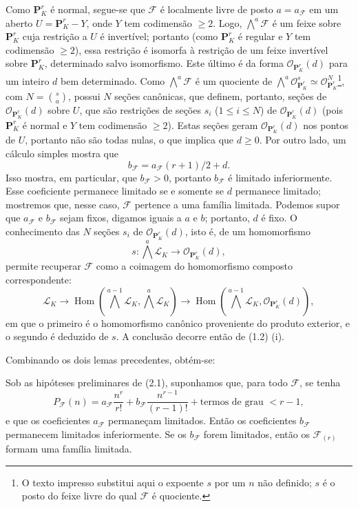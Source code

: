 Como $\mathbf P^r_K$ é normal, segue-se que $\mathcal F$ é localmente livre de
posto $a=a_{\mathcal F}$ em um aberto $U=\mathbf P^r_K-Y$, onde $Y$ tem
codimensão $\geq2$. Logo, $\bigwedge^a\mathcal F$ é um feixe sobre
$\mathbf P^r_K$ cuja restrição a $U$ é invertível; portanto (como
$\mathbf P^r_K$ é regular e $Y$ tem codimensão $\geq2$), essa restrição é
isomorfa à restrição de um feixe invertível sobre $\mathbf P^r_K$, determinado
salvo isomorfismo. Este último é da forma $\mathcal O_{\mathbf P^r_K}(d)$ para um
inteiro $d$ bem determinado. Como $\bigwedge^a\mathcal F$ é um quociente de
$\bigwedge^a\mathcal O_{\mathbf P^r_K}^{s}\simeq
\mathcal O_{\mathbf P^r_K}^{N}$\footnote{O texto impresso substitui aqui o
expoente $s$ por um $n$ não definido; $s$ é o posto do feixe livre do qual
$\mathcal F$ é quociente.}, com $N=\binom{s}{a}$, possui $N$ seções canônicas,
que definem, portanto, seções de
$\mathcal O_{\mathbf P^r_K}(d)$ sobre $U$, que são restrições de seções
$s_i$ ($1\leq i\leq N$) de $\mathcal O_{\mathbf P^r_K}(d)$ (pois
$\mathbf P^r_K$ é normal e $Y$ tem codimensão $\geq2$). Estas seções
geram $\mathcal O_{\mathbf P^r_K}(d)$ nos pontos de $U$, portanto não são
todas nulas, o que implica que $d\geq0$. Por outro lado, um cálculo simples
mostra que
\[
b_{\mathcal F}=a_{\mathcal F}(r+1)/2+d.
\]
Isso mostra, em particular, que $b_{\mathcal F}>0$, portanto
$b_{\mathcal F}$ é limitado inferiormente. Esse coeficiente permanece limitado
se e somente se $d$ permanece limitado; mostremos que, nesse caso, $\mathcal F$
pertence a uma família limitada. Podemos supor que $a_{\mathcal F}$ e
$b_{\mathcal F}$ sejam fixos, digamos iguais a $a$ e $b$; portanto, $d$ é fixo.
O conhecimento das $N$ seções
$s_i$ de $\mathcal O_{\mathbf P^r_K}(d)$, isto é, de um homomorfismo
\[
s:\bigwedge^a\mathcal L_K\longrightarrow\mathcal O_{\mathbf P^r_K}(d),
\]
permite recuperar $\mathcal F$ como a coimagem do homomorfismo composto
correspondente:
\[
\mathcal L_K\longrightarrow
\operatorname{Hom}\!\left(\bigwedge^{a-1}\mathcal L_K,
\bigwedge^a\mathcal L_K\right)\longrightarrow
\operatorname{Hom}\!\left(\bigwedge^{a-1}\mathcal L_K,
\mathcal O_{\mathbf P^r_K}(d)\right),
\]
em que o primeiro é o homomorfismo canônico proveniente do produto exterior, e
o segundo é deduzido de $s$. A conclusão decorre então de (1.2) (i).

Combinando os dois lemas precedentes, obtém-se:

 Sob as hipóteses preliminares de (2.1), suponhamos que, para
todo $\mathcal F$, se tenha
\[
P_{\mathcal F}(n)=a_{\mathcal F}\frac{n^r}{r!}
+b_{\mathcal F}\frac{n^{r-1}}{(r-1)!}
+\text{termos de grau $<r-1$},
\]
e que os coeficientes $a_{\mathcal F}$ permaneçam limitados. Então os
coeficientes $b_{\mathcal F}$ permanecem limitados inferiormente. Se os
$b_{\mathcal F}$ forem limitados, então os $\mathcal F_{(r)}$ formam uma família
limitada.

